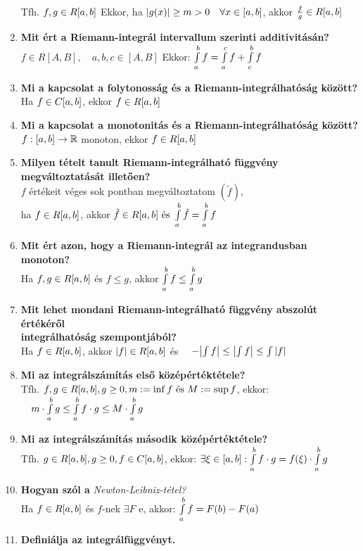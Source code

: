 \documentclass[a4paper,11pt]{article}
\begin{document}
\begin{enumerate}
	Tfh. $f,g\in R[a,b]$ Ekkor, ha $\abs{g(x)}\geq m>0\quad\forall x\in[a,b]$, akkor $\frac{f}{g}\in R[a,b]$
	\item\textbf{Mit ért a Riemann-integrál intervallum szerinti additivitásán?}\\[0.1cm]
	$f\in R[A,B],\quad a,b,c\in[A,B]$ Ekkor: $\int\limits_{a}^{b} f=\int\limits_a^cf+
	\int\limits_c^bf$
	\item\textbf{Mi a kapcsolat a folytonosság és a Riemann-integrálhatóság között?}\\[0.1cm]
	Ha $f\in C[a,b]$, ekkor $f\in R[a,b]$
	\item\textbf{Mi a kapcsolat a monotonitás és a Riemann-integrálhatóság között?}\\[0.1cm]
	$f:[a,b]\to\mathbb{R}$ monoton, ekkor $f\in R[a,b]$
	\item\textbf{Milyen tételt tanult Riemann-integrálható függvény
	megváltoztatását illetően?}\\[0.1cm]
	$f$ értékeit véges sok pontban megváltoztatom $(\tilde{f})$,\\[0.2cm]ha
	$f\in R[a,b]$, akkor $\tilde{f}\in R[a,b]\text{ és }\int\limits_{a}^{b}\tilde{f}=\int\limits_{a}^{b} f$\newpage
	\item\textbf{Mit ért azon, hogy a Riemann-integrál az integrandusban
	monoton?}\\[0.1cm]
	Ha $f,g\in R[a,b]$ és $f\leq g$, akkor $\int\limits_{a}^{b} f\leq\int\limits_{a}^{b} g$
	\item\textbf{Mit lehet mondani Riemann-integrálható függvény abszolút
	értékéről \\ integrálhatóság szempontjából?}\\[0.1cm]
	Ha $f\in R[a,b]$, akkor $\abs{f}\in R[a,b]$ és $\quad-\abs{\int f}\leq\abs{\int f}
	\leq\int\abs{f}$
	\item\textbf{Mi az integrálszámítás első középértéktétele?}\\[0.1cm]
	Tfh. $f,g\in R[a,b],g\geq0,m:=\inf f\text{ és }M:=\sup f$, ekkor:
	$\quad m\cdot\int\limits_{a}^{b} g\leq\int\limits_{a}^{b} f\cdot g\leq M\cdot\int\limits_{a}^{b} g$
	\item\textbf{Mi az integrálszámítás második középértéktétele?}\\[0.1cm]
	Tfh. $g\in R[a,b],g\geq0,f\in C[a,b]$, ekkor: $\exists\xi\in[a,b]:\int\limits_{a}^{b} f\cdot g=
	f(\xi)\cdot\int\limits_{a}^{b} g$
	\item\textbf{Hogyan szól a} \textit{Newton-Leibniz-tétel?}\\[0.1cm]
	Ha $f\in R[a,b]$ és $f$-nek $\exists F$ \prfv e, akkor: $\int\limits_{a}^{b} f=F(b)-F(a)$
	\item\textbf{Definiálja az integrálfüggvényt.}\\[0.1cm]

\end{enumerate}
\end{document}
